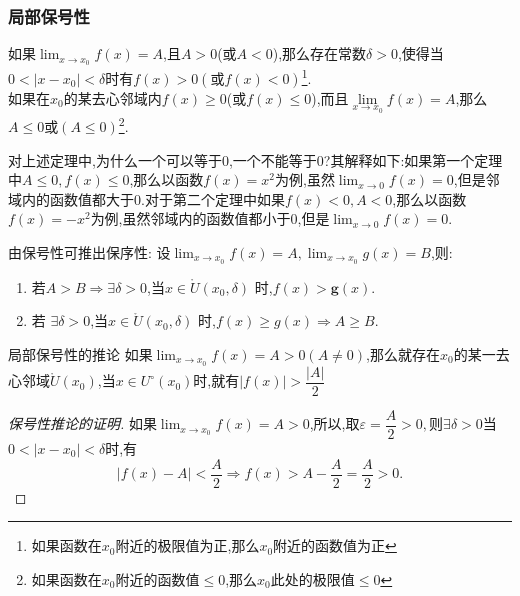 \documentclass[8pt a4paper, oneside, UTF8]{ctexbook}
\begin{document}
\begin{sloppypar}
    \subsubsection{局部保号性}
    \begin{them}{}{}
        如果$\lim_{x\to x_0}f(x)=A$,且$A>0$(或$A<0$),那么存在常数$\delta>0$,使得当$0<|x-x_0|<\delta$时有$f(x)>0(或f(x)<0)$\footnote{如果函数在$x_0$附近的极限值为正,那么$x_0$附近的函数值为正}.
        \\
        如果在$x_0$的某去心邻域内$f(x)\geqslant 0$(或$f(x)\leqslant 0$),而且$\underset{x\to x_0}{\operatorname*{lim}}f(x)=A$,那么$A \leqslant 0$或$(A \leq 0)$\footnote{如果函数在$x_0$附近的函数值$\leq 0$,那么$x_0$此处的极限值$\le 0$}.
    \end{them}
    对上述定理中,为什么一个可以等于0,一个不能等于0?其解释如下:如果第一个定理中$A \leqslant 0,f(x)\leqslant 0$,那么以函数$f(x)={x^2}$为例,虽然$\lim_{x \to 0}f(x)=0 $,但是邻域内的函数值都大于0.对于第二个定理中如果$f(x) < 0,A< 0$,那么以函数$f(x)={-x^2}$为例,虽然邻域内的函数值都小于0,但是$\lim_{x \to 0}f(x)=0 $.
    \begin{criterion}{}{}
        由保号性可推出保序性:
        设$\lim_{x\to x_0}f(x)=A,\lim_{x\to x_{0}}g(x)=B$,则:
        \begin{enumerate}
            \item 若$A>B\Rightarrow\exists\delta>0$,当${x}\in\mathring{U}(x_0,\delta)$ 时,$f(x)>\mathbf{g}(x).$
            \item 若 $\exists\delta>0$,当$x\in\mathring{U}(x_0,\delta)$ 时,$f(x)\geqslant g(x)\Rightarrow A\geqslant B.$
        \end{enumerate}
    \end{criterion}
    \begin{corollary}{局部保号性的推论}{}
        如果$\lim_{x\to x_{0}}f(x)=A > 0(A \neq 0)$,那么就存在$x_0$的某一去心邻域$\mathring{U}\left(x_{0}\right)$,当$x\in U^{\circ}(x_{0})$时,就有$|f(x)|>\dfrac{|A|}{2}$
        \begin{proof}[保号性推论的证明]
            如果$\lim_{x\to x_{0}}f(x)=A > 0$,所以,取$\varepsilon=\dfrac{A}{2}>0,则\exists \delta >0 $当$0<|x-x_0|<\delta$时,有
            $$
                |f(x)-A|<\dfrac{A}{2}\Rightarrow f(x)>A-\dfrac{A}{2}=\dfrac{A}{2}>0.
            $$
        \end{proof}
    \end{corollary}

\end{sloppypar}
\end{document}

